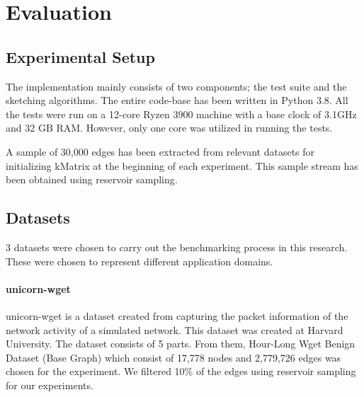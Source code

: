 \section{Evaluation}

\subsection{Experimental Setup}

The implementation mainly consists of two components; the test suite and the sketching algorithms. The entire code-base has been written in Python 3.8. All the tests were run on a 12-core Ryzen 3900 machine with a base clock of 3.1GHz and 32 GB RAM. However, only one core was utilized in running the tests. 



A sample of 30,000 edges has been extracted from relevant datasets for initializing kMatrix at the beginning of each experiment. This sample stream has been obtained using reservoir sampling. 

\subsection{Datasets}

3 datasets were chosen to carry out the benchmarking process in this research. These were chosen to represent different application domains. 

\paragraph{unicorn-wget\cite{DVN/5H4TDI_2018}}
unicorn-wget is a dataset created from capturing the packet information of the network activity of a simulated network. This dataset was created at Harvard University. The dataset consists of 5 parts. From them, Hour-Long Wget Benign Dataset (Base Graph) which consist of 17,778 nodes and 2,779,726 edges was chosen for the experiment. We filtered 10\% of the edges using reservoir sampling for our experiments. 


